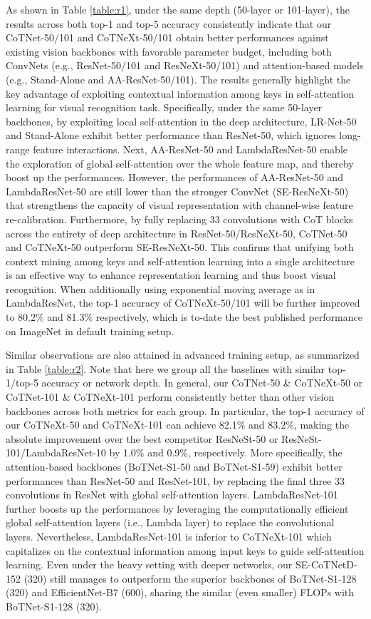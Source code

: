 \documentclass[10pt,twocolumn,letterpaper]{article}
\begin{document}
As shown in Table \ref{table:r1}, under the same depth (50-layer or 101-layer), the results across both top-1 and top-5 accuracy consistently indicate that our CoTNet-50/101 and CoTNeXt-50/101 obtain better performances against existing vision backbones with favorable parameter budget, including both ConvNets (e.g., ResNet-50/101 and ResNeXt-50/101) and attention-based models (e.g., Stand-Alone and AA-ResNet-50/101). The results generally highlight the key advantage of exploiting contextual information among keys in self-attention learning for visual recognition task. Specifically, under the same 50-layer backbones, by exploiting local self-attention in the deep architecture, LR-Net-50 and Stand-Alone exhibit better performance than ResNet-50, which ignores long-range feature interactions. Next, AA-ResNet-50 and LambdaResNet-50 enable the exploration of global self-attention over the whole feature map, and thereby boost up the performances. However, the performances of AA-ResNet-50 and LambdaResNet-50 are still lower than the stronger ConvNet (SE-ResNeXt-50) that strengthens the capacity of visual representation with channel-wise feature re-calibration. Furthermore, by fully replacing 33 convolutions with CoT blocks across the entirety of deep architecture in ResNet-50/ResNeXt-50, CoTNet-50 and CoTNeXt-50 outperform SE-ResNeXt-50. This confirms that unifying both context mining among keys and self-attention learning into a single architecture is an effective way to enhance representation learning and thus boost visual recognition.
When additionally using exponential moving average as in LambdaResNet, the top-1 accuracy of CoTNeXt-50/101 will be further improved to 80.2\% and 81.3\% respectively, which is to-date the best published performance on ImageNet in default training setup.

Similar observations are also attained in advanced training setup, as summarized in Table \ref{table:r2}. Note that here we group all the baselines with similar top-1/top-5 accuracy or network depth. In general, our CoTNet-50 \& CoTNeXt-50 or CoTNet-101 \& CoTNeXt-101 perform consistently better than other vision backbones across both metrics for each group. In particular, the top-1 accuracy of our CoTNeXt-50 and CoTNeXt-101 can achieve 82.1\% and 83.2\%, making the absolute improvement over the best competitor ResNeSt-50 or ResNeSt-101/LambdaResNet-10 by 1.0\% and 0.9\%, respectively. More specifically, the attention-based backbones (BoTNet-S1-50 and BoTNet-S1-59) exhibit better performances than ResNet-50 and ResNet-101, by replacing the final three 33 convolutions in ResNet with global self-attention layers. LambdaResNet-101 further boosts up the performances by leveraging the computationally efficient global self-attention layers (i.e., Lambda layer) to replace the convolutional layers. Nevertheless, LambdaResNet-101 is inferior to CoTNeXt-101 which capitalizes on the contextual information among input keys to guide self-attention learning. Even under the heavy setting with deeper networks, our SE-CoTNetD-152 (320) still manages to outperform the superior backbones of BoTNet-S1-128 (320) and EfficientNet-B7 (600), sharing the similar (even smaller) FLOPs with BoTNet-S1-128 (320).
\end{document}
